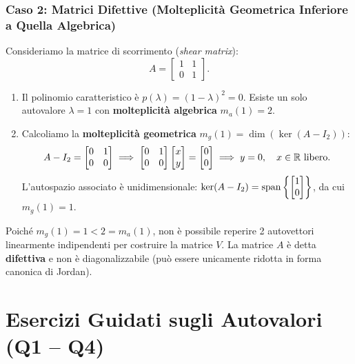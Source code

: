 \subsubsection{Caso 2: Matrici Difettive (Molteplicit\`a Geometrica Inferiore a Quella Algebrica)}
Consideriamo la matrice di scorrimento (\textit{shear matrix}):
\begin{equation}
    A = \begin{bmatrix} 1 & 1 \\ 0 & 1 \end{bmatrix}.
\end{equation}
\begin{enumerate}
    \item Il polinomio caratteristico \`e $p(\lambda) = (1-\lambda)^2 = 0$. Esiste un solo autovalore $\lambda = 1$ con \textbf{molteplicit\`a algebrica} $m_a(1) = 2$.
    \item Calcoliamo la \textbf{molteplicit\`a geometrica} $m_g(1) = \dim(\ker(A - I_2))$:
    \begin{equation}
        A - I_2 = \begin{bmatrix} 0 & 1 \\ 0 & 0 \end{bmatrix} \implies \begin{bmatrix} 0 & 1 \\ 0 & 0 \end{bmatrix} \begin{bmatrix} x \\ y \end{bmatrix} = \begin{bmatrix} 0 \\ 0 \end{bmatrix} \implies y = 0, \quad x \in \mathbb{R} \text{ libero}.
    \end{equation}
    L'autospazio associato \`e unidimensionale: $\ker(A - I_2) = \operatorname{span}\left\{\begin{bmatrix} 1 \\ 0 \end{bmatrix}\right\}$, da cui $m_g(1) = 1$.
\end{enumerate}
Poich\'e $m_g(1) = 1 < 2 = m_a(1)$, non \`e possibile reperire 2 autovettori linearmente indipendenti per costruire la matrice $V$. La matrice $A$ \`e detta \textbf{difettiva} e non \`e diagonalizzabile (pu\`o essere unicamente ridotta in forma canonica di Jordan).

\FloatBarrier
\section{Esercizi Guidati sugli Autovalori (Q1 -- Q4)}


